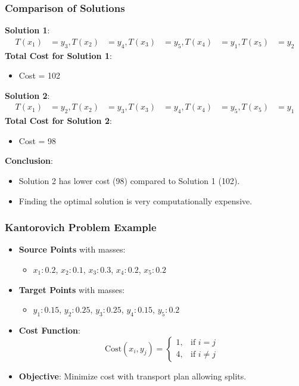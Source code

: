 \documentclass{beamer}
\begin{document}
		\begin{frame}
			\frametitle{Comparison of Solutions}
			\textbf{Solution 1}:
			\begin{align*}
				T(x_1) &= y_3, T(x_2) &= y_4, T(x_3) &= y_5, T(x_4) &= y_1, T(x_5) &= y_2
			\end{align*}
			\textbf{Total Cost for Solution 1}:
			\begin{itemize}
				\item Cost  = 102
			\end{itemize}
			
			\vspace{0.5cm}
			
			\textbf{Solution 2}:
			\begin{align*}
				T(x_1) &= y_2, T(x_2) &= y_3, T(x_3) &= y_4, T(x_4) &= y_5, T(x_5) &= y_1
			\end{align*}
			\textbf{Total Cost for Solution 2}:
			\begin{itemize}
				\item Cost  = 98
			\end{itemize}
			
			\vspace{0.5cm}
			
			\textbf{Conclusion}:
			\begin{itemize}
				\item Solution 2 has lower cost (98) compared to Solution 1 (102).
				\item Finding the optimal solution is very computationally expensive.
			\end{itemize}
		\end{frame}
		
		\begin{frame}
			\frametitle{Kantorovich Problem Example}
			\begin{itemize}
				\item \textbf{Source Points} with masses:
				\begin{itemize}
					\item \(x_1: 0.2\), \(x_2: 0.1\), \(x_3: 0.3\), \(x_4: 0.2\), \(x_5: 0.2\)
				\end{itemize}
				\item \textbf{Target Points} with masses:
				\begin{itemize}
					\item \(y_1: 0.15\), \(y_2: 0.25\), \(y_3: 0.25\), \(y_4: 0.15\), \(y_5: 0.2\)
				\end{itemize}
				\item \textbf{Cost Function}:
				\[
				\text{Cost}(x_i, y_j) = 
				\begin{cases} 
					1, & \text{if } i = j \\ 
					4, & \text{if } i \neq j 
				\end{cases}
				\]
				\item \textbf{Objective}: Minimize cost with transport plan allowing splits.
			\end{itemize}
		\end{frame}
		
\end{document}
